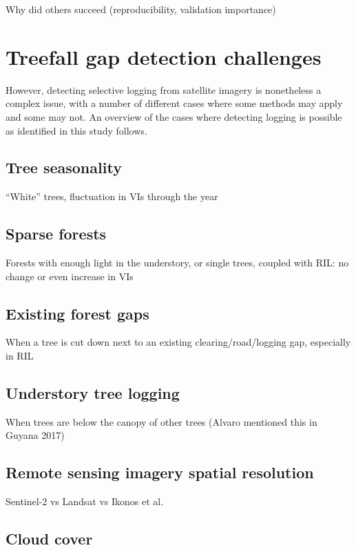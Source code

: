 \documentclass[a4paper,12pt]{scrbook}
\begin{document}
Why did others succeed (reproducibility, validation importance)

\section{Treefall gap detection challenges}

However, detecting selective logging from satellite imagery is nonetheless a complex issue, with a number of different cases where some methods may apply and some may not. An overview of the cases where detecting logging is possible as identified in this study follows.

\subsection{Tree seasonality}

``White'' trees, fluctuation in VIs through the year

\subsection{Sparse forests}

Forests with enough light in the understory, or single trees, coupled with \ac{RIL}: no change or even increase in VIs

\subsection{Existing forest gaps}

When a tree is cut down next to an existing clearing/road/logging gap, especially in \ac{RIL}

\subsection{Understory tree logging}

When trees are below the canopy of other trees (Alvaro mentioned this in Guyana 2017)

\subsection{Remote sensing imagery spatial resolution}

Sentinel-2 vs Landsat vs Ikonos et al.

\subsection{Cloud cover}
\end{document}
